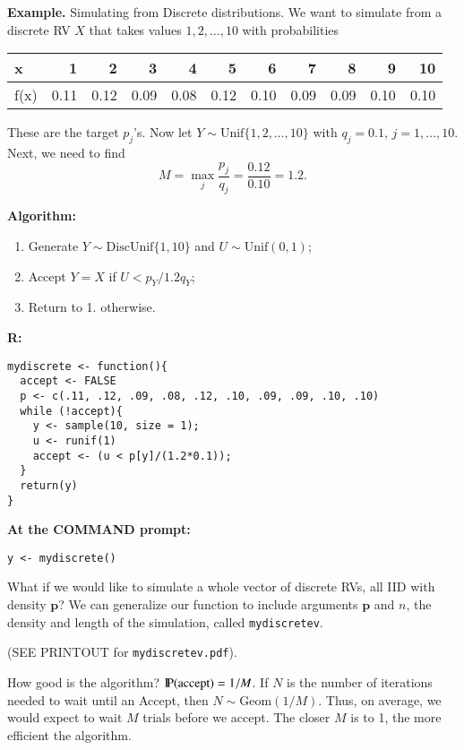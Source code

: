 \documentclass[11pt,english]{scrbook}
\begin{document}
\textbf{Example.} Simulating from Discrete distributions. We want to simulate from a discrete RV \(X\) that takes values \(1,2,\ldots,10\) with probabilities

\begin{center}
\begin{tabular}{lrrrrrrrrrr}
x & 1 & 2 & 3 & 4 & 5 & 6 & 7 & 8 & 9 & 10\\
\hline
f(x) & 0.11 & 0.12 & 0.09 & 0.08 & 0.12 & 0.10 & 0.09 & 0.09 & 0.10 & 0.10\\
\end{tabular}
\end{center}

These are the target \(p_{j}\)'s. Now let \(Y\sim\mathrm{Unif}\{1,2,\ldots,10\}\) with \(q_{j}=0.1\), \(j=1,\ldots,10\). Next, we need to find 
\[ 
M=\max_{j}\frac{p_{j}}{q_{j}}=\frac{0.12}{0.10}=1.2.
\]

\textbf{Algorithm:}
\begin{enumerate}
\item Generate \(Y \sim \mathrm{DiscUnif}\{1,10\}\) and \(U\sim\mathrm{Unif}(0,1)\);
\item Accept \(Y = X\) if \(U < p_{Y}/1.2 q_{Y}\);
\item Return to 1. otherwise.
\end{enumerate}

\textbf{R:}
\begin{verbatim}
mydiscrete <- function(){
  accept <- FALSE
  p <- c(.11, .12, .09, .08, .12, .10, .09, .09, .10, .10)
  while (!accept){
    y <- sample(10, size = 1);
    u <- runif(1)
    accept <- (u < p[y]/(1.2*0.1));
  }
  return(y)
}
\end{verbatim}

\textbf{At the COMMAND prompt:}
\begin{verbatim}
y <- mydiscrete()
\end{verbatim}

What if we would like to simulate a whole vector of discrete RVs, all IID with density \(\mathbf{p}\)? We can generalize our function to include arguments \(\mathbf{p}\) and \(n\), the density and length of the simulation, called \texttt{mydiscretev}.

(SEE PRINTOUT for \texttt{mydiscretev.pdf}).

How good is the algorithm? \(\P(\mbox{accept}) = 1/M\). If \(N\) is the number of iterations needed to wait until an Accept, then \(N\sim\mathrm{Geom}(1/M)\). Thus, on average, we would expect to wait \(M\) trials before we accept. The closer \(M\) is to 1, the more efficient the algorithm.
\end{document}
